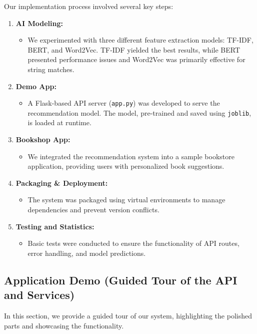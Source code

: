 \documentclass{article}
\begin{document}
Our implementation process involved several key steps:
\begin{enumerate}
    \item \textbf{AI Modeling:}
    \begin{itemize}
        \item We experimented with three different feature extraction models: TF-IDF, BERT, and Word2Vec. TF-IDF yielded the best results, while BERT presented performance issues and Word2Vec was primarily effective for string matches.
    \end{itemize}
    \item \textbf{Demo App:}
    \begin{itemize}
        \item A Flask-based API server (\texttt{app.py}) was developed to serve the recommendation model. The model, pre-trained and saved using \texttt{joblib}, is loaded at runtime.
    \end{itemize}
    \item \textbf{Bookshop App:}
    \begin{itemize}
        \item We integrated the recommendation system into a sample bookstore application, providing users with personalized book suggestions.
    \end{itemize}
    \item \textbf{Packaging \& Deployment:}
    \begin{itemize}
        \item The system was packaged using virtual environments to manage dependencies and prevent version conflicts.
    \end{itemize}
    \item \textbf{Testing and Statistics:}
    \begin{itemize}
        \item Basic tests were conducted to ensure the functionality of API routes, error handling, and model predictions.
    \end{itemize}
\end{enumerate}

\subsection{Application Demo (Guided Tour of the API and Services)}

In this section, we provide a guided tour of our system, highlighting the polished parts and showcasing the functionality.
\end{document}
